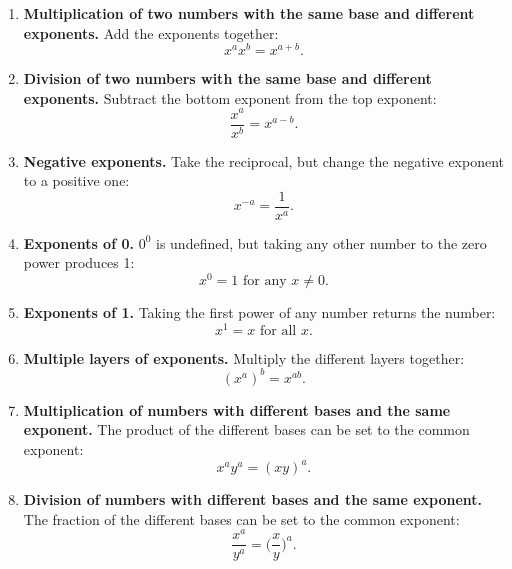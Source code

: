 

\begin{enumerate}
\item \textbf{Multiplication of two numbers with the same base and different exponents.} Add the exponents together:\vspace*{-3pt}
\begin{equation*}
x^a x^b=x^{a+b}.
\end{equation*}
\item \textbf{Division of two numbers with the same base and different exponents.} Subtract the bottom exponent from the top exponent:
\begin{equation*}
\frac{x^a}{x^b}=x^{a-b}.
\end{equation*}
\item \textbf{Negative exponents.}  Take the reciprocal, but change the negative exponent to a positive one:\vspace*{-3pt}
\begin{equation*}
x^{-a}=\frac{1}{x^a}.
\end{equation*}
\item \textbf{Exponents of 0.}  $0^0$ is undefined, but taking any other number to the zero power produces 1:\vspace*{-3pt}
\begin{equation*}
x^0=1 \text{   for any   }x\neq 0.
\end{equation*}
\item \textbf{Exponents of 1.}  Taking the first power of any number returns the number:
\begin{equation*}
x^1=x\text{   for all   }x.
\end{equation*}
\item \textbf{Multiple layers of exponents.}  Multiply the different layers together:
\begin{equation*}
(x^a)^b=x^{ab}.
\end{equation*}
\item \textbf{Multiplication of numbers with different bases and the same exponent.}  The product of the different bases can be set to the common exponent:
\begin{equation*}
x^ay^a=(xy)^a.
\end{equation*}
\item \textbf{Division of numbers with different bases and the same exponent.} The fraction of the different bases can be set to the common exponent:
\begin{equation*}
\frac{x^a}{y^a}=\bigg(\frac{x}{y}\bigg)^a.
\end{equation*}
\end{enumerate}


